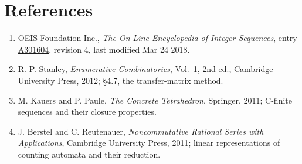 \documentclass[11pt]{article}
\theoremstyle{definition}
\begin{document}
\section{References}

\begin{enumerate}

\item OEIS Foundation Inc., \emph{The On-Line Encyclopedia of Integer Sequences}, entry \href{https://oeis.org/A301604}{A301604}, revision 4, last modified Mar 24 2018.

\item R. P. Stanley, \emph{Enumerative Combinatorics}, Vol.~1, 2nd ed., Cambridge University Press, 2012; \S4.7, the transfer-matrix method.

\item M. Kauers and P. Paule, \emph{The Concrete Tetrahedron}, Springer, 2011; C-finite sequences and their closure properties.

\item J. Berstel and C. Reutenauer, \emph{Noncommutative Rational Series with Applications}, Cambridge University Press, 2011; linear representations of counting automata and their reduction.

\end{enumerate}
\end{document}
